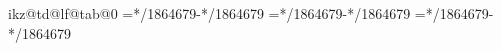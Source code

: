 \def\tikz@td@lf@getmain{%
\iftikz@td@lf@active\else
\pgfgettransform\tikz@td@m@T
\edef\tikz@td@m@vecstr{\tikz@td@curvec}%
\edef\tikz@td@m@state{\pgf@xx=\the\pgf@xx\pgf@xy=\the\pgf@xy
 \pgf@yx=\the\pgf@yx\pgf@yy=\the\pgf@yy\pgf@zx=\the\pgf@zx\pgf@zy=\the\pgf@zy
 \tikz@td@dzx=\the\tikz@td@dzx\tikz@td@dzy=\the\tikz@td@dzy
 \tikz@td@dzz=\the\tikz@td@dzz\tikz@td@sd=\the\tikz@td@sd\relax}%
\fi
\expandafter\tikz@td@minv\expandafter{\tikz@td@m@vecstr}}%
\def\tikz@td@lf@restoremain{\pgfsettransform{\tikz@td@m@T}\tikz@td@m@state}%
\def\tikz@td@lf@identity{\def\tikz@td@lf@o{0,0,0}\def\tikz@td@lf@a{1,0,0}%
\def\tikz@td@lf@b{0,1,0}\def\tikz@td@lf@c{0,0,1}\def\tikz@td@lf@da{1,0,0}%
\def\tikz@td@lf@db{0,1,0}\def\tikz@td@lf@dc{0,0,1}}%
\let\tikz@td@lf@g\tikz@td@lf@identity
\expandafter\let\csname tikz@td@lf@tab@0\endcsname\tikz@td@lf@identity
\def\tikz@td@lf@load{\iftikz@td@lf@active\else\tikz@td@lf@g\fi}%
\def\tikz@td@updatedz{%
\tikz@td@dzx=\dimexpr\pgf@yx*\pgf@zy/1864679-\pgf@zx*\pgf@yy/1864679\relax
\tikz@td@dzy=\dimexpr\pgf@zx*\pgf@xy/1864679-\pgf@xx*\pgf@zy/1864679\relax
\tikz@td@dzz=\dimexpr\pgf@xx*\pgf@yy/1864679-\pgf@yx*\pgf@xy/1864679\relax}%
\tikz@td@updatedz
\let\tikz@td@orig@pgfsetxvec\pgfsetxvec
\let\tikz@td@orig@pgfsetyvec\pgfsetyvec
\let\tikz@td@orig@pgfsetzvec\pgfsetzvec
\def\pgfsetxvec#1{\tikz@td@orig@pgfsetxvec{#1}\tikz@td@updatedz\ignorespaces}%
\def\pgfsetyvec#1{\tikz@td@orig@pgfsetyvec{#1}\tikz@td@updatedz\ignorespaces}%
\def\pgfsetzvec#1{\tikz@td@orig@pgfsetzvec{#1}\tikz@td@updatedz\ignorespaces}%
\def\tikz@td@zreset{\global\tikz@td@z=0pt\global\tikz@td@zoktrue\global\tikz@td@simplefalse}%
\protected\def\tikz@td@zunknown{\global\tikz@td@zokfalse\global\tikz@td@simplefalse}%
\protected\def\tikz@td@setz#1#2{\global\tikz@td@z=#1\relax
\ifnum#2=0 \global\tikz@td@zokfalse\fi\global\tikz@td@simplefalse}%
\let\tikz@td@orig@pgfpointxyz\pgfpointxyz
\def\pgfpointxyz#1#2#3{\tikz@td@orig@pgfpointxyz{#1}{#2}{#3}%
\global\tikz@td@z=\pgftemp@x\tikz@td@dzx
\global\advance\tikz@td@z by\pgftemp@y\tikz@td@dzy
\global\advance\tikz@td@z by\pgftemp@z\tikz@td@dzz\global\tikz@td@simpletrue}%
\let\tikz@td@orig@pgfpointxy\pgfpointxy
\def\pgfpointxy#1#2{\tikz@td@orig@pgfpointxy{#1}{#2}%
\global\tikz@td@z=\pgftemp@x\tikz@td@dzx
\global\advance\tikz@td@z by\pgftemp@y\tikz@td@dzy\global\tikz@td@simpletrue}%
